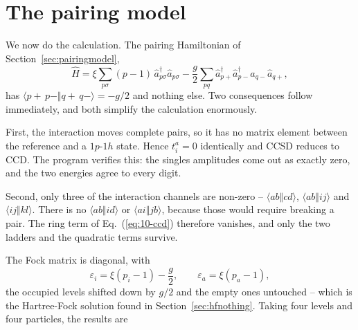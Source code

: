 \section{The pairing model}
\label{sec:ccpairing}

We now do the calculation.  The pairing Hamiltonian of
Section~\ref{sec:pairingmodel},
\begin{equation}
  \hat{H} = \xi\sum_{p\sigma}(p-1)\,
    \hat{a}^{\dagger}_{p\sigma}\hat{a}_{p\sigma}
  - \frac{g}{2}\sum_{pq}\hat{a}^{\dagger}_{p+}\hat{a}^{\dagger}_{p-}
    \hat{a}_{q-}\hat{a}_{q+},
  \label{eq:10-pairing}
\end{equation}
has $\langle p{+}\,p{-}\Vert q{+}\,q{-}\rangle=-g/2$ and nothing else.  Two
consequences follow immediately, and both simplify the calculation
enormously.

First, the interaction moves complete pairs, so it has no matrix element
between the reference and a $1p$-$1h$ state.  Hence $t_i^a=0$ identically and
CCSD reduces to CCD.  The program verifies this: the singles amplitudes come
out as exactly zero, and the two energies agree to every digit.

Second, only three of the interaction channels are non-zero --
$\langle ab\Vert cd\rangle$, $\langle ab\Vert ij\rangle$ and
$\langle ij\Vert kl\rangle$.  There is no $\langle ab\Vert id\rangle$ or
$\langle ai\Vert jb\rangle$, because those would require breaking a pair.  The
ring term of Eq.~(\ref{eq:10-ccd}) therefore vanishes, and only the two
ladders and the quadratic terms survive.

The Fock matrix is diagonal, with
\begin{equation}
  \varepsilon_i = \xi(p_i-1) - \frac{g}{2},
  \qquad
  \varepsilon_a = \xi(p_a-1),
  \label{eq:10-pairingfock}
\end{equation}
the occupied levels shifted down by $g/2$ and the empty ones untouched --
which is the Hartree-Fock solution found in Section~\ref{sec:hfnothing}.
Taking four levels and four particles, the results are

